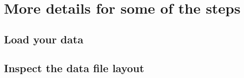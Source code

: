 \section{More details for some of the steps}
\label{.detail}

\subsection{Load your data}
\label{.detail.load}

\subsection{Inspect the data file layout}
\label{.detail.layout}

